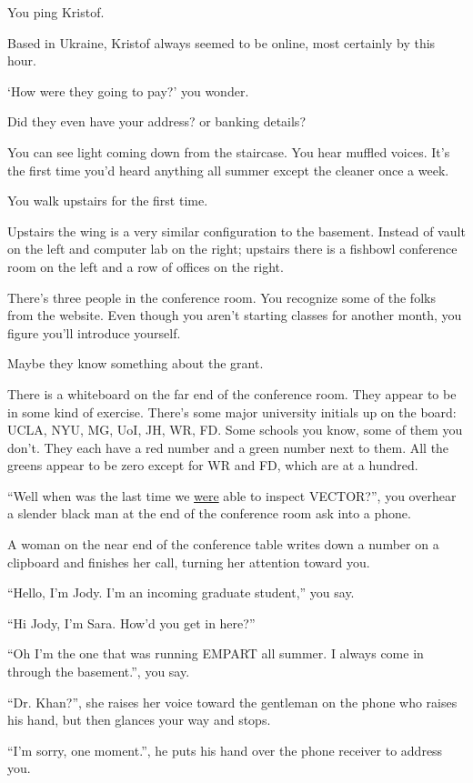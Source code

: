 \documentclass[17pt, twoside, a5paper, openright, extrafontsizes]{memoir}
\renewcommand{\emph}[1]{\ul{#1}}
\begin{document}
You ping Kristof.

Based in Ukraine, Kristof always seemed to be online, most certainly by
this hour.

`How were they going to pay?' you wonder.

Did they even have your address? or banking details?

You can see light coming down from the staircase. You hear muffled
voices. It's the first time you'd heard anything all summer except the
cleaner once a week.

You walk upstairs for the first time.

Upstairs the wing is a very similar configuration to the basement.
Instead of vault on the left and computer lab on the right; upstairs
there is a fishbowl conference room on the left and a row of offices on
the right.

There's three people in the conference room. You recognize some of the
folks from the website. Even though you aren't starting classes for
another month, you figure you'll introduce yourself.

Maybe they know something about the grant.

There is a whiteboard on the far end of the conference room. They appear
to be in some kind of exercise. There's some major university initials
up on the board: UCLA, NYU, MG, UoI, JH, WR, FD. Some schools you know,
some of them you don't. They each have a red number and a green number
next to them. All the greens appear to be zero except for WR and FD,
which are at a hundred.

``Well when was the last time we \emph{were} able to inspect VECTOR?'',
you overhear a slender black man at the end of the conference room ask
into a phone.

A woman on the near end of the conference table writes down a number on
a clipboard and finishes her call, turning her attention toward you.

``Hello, I'm Jody. I'm an incoming graduate student,'' you say.

``Hi Jody, I'm Sara. How'd you get in here?''

``Oh I'm the one that was running EMPART all summer. I always come in
through the basement.'', you say.

``Dr. Khan?'', she raises her voice toward the gentleman on the phone
who raises his hand, but then glances your way and stops.

``I'm sorry, one moment.'', he puts his hand over the phone receiver to
address you.
\end{document}
